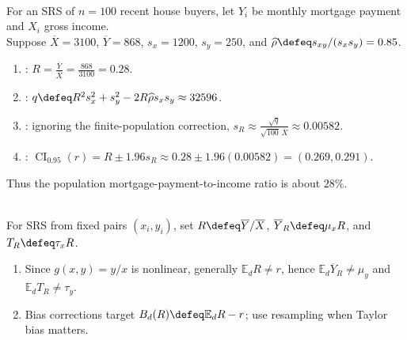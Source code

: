 \begin{example} \label{ex:mortgage-income-ratio-estimate} \\
For an SRS of $n=100$ recent house buyers, let $Y_i$ be monthly mortgage payment and $X_i$ gross income.\\
Suppose $\overline{X}=3100$, $\overline{Y}=868$, $s_x=1200$, $s_y=250$, and $\widehat\rho\defeq s_{xy}/(s_xs_y)=0.85$.
\begin{enumerate}[label=(\roman*)]
\setlength{\itemsep}{0pt}
\item {}: $R=\frac{\overline{Y}}{\overline{X}}=\frac{868}{3100}=0.28$.
\item {}: $q\defeq R^2s_x^2+s_y^2-2R\widehat\rho s_xs_y\approx32596$.
\item {}: ignoring the finite-population correction, $s_R\approx\frac{\sqrt q}{\sqrt{100}\,\overline{X}}\approx0.00582$.
\item {}: $\operatorname{CI}_{0.95}(r)=R\pm1.96s_R\approx0.28\pm1.96(0.00582)=(0.269,0.291)$.
\end{enumerate}
Thus the population mortgage-payment-to-income ratio is about $28\%$.
\end{example}

\begin{remark} \label{rem:ratio-bias-and-resampling-todo} \\
For SRS from fixed pairs $(x_i,y_i)$, set $R\defeq\overline{Y}/\overline{X}$, $\overline{Y}_R\defeq\mu_xR$, and $T_R\defeq\tau_xR$.
\begin{enumerate}[label=(\roman*)]
\setlength{\itemsep}{0pt}
\item Since $g(x,y)=y/x$ is nonlinear, generally $\mathbb{E}_dR\neq r$, hence $\mathbb{E}_d\overline{Y}_R\neq\mu_y$ and $\mathbb{E}_dT_R\neq\tau_y$.
\item Bias corrections target $B_d(R)\defeq\mathbb{E}_dR-r$; use resampling when Taylor bias matters.
\end{enumerate}
\end{remark}
